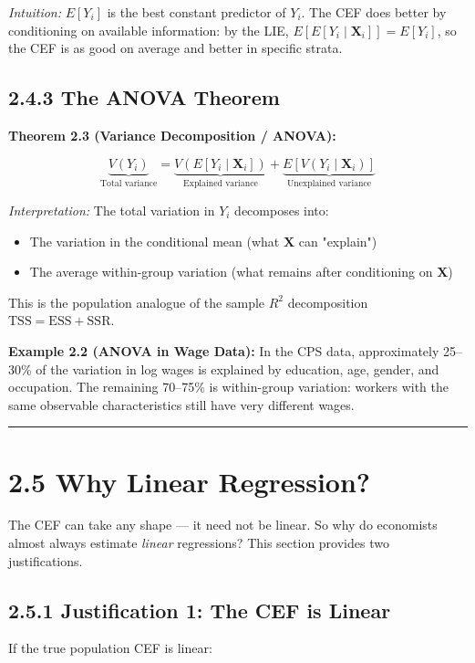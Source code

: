 \textit{Intuition:} $E[Y_i]$ is the best constant predictor of $Y_i$. The CEF does better by conditioning on available information: by the LIE, $E[E[Y_i \mid \mathbf{X}_i]] = E[Y_i]$, so the CEF is as good on average and better in specific strata.

\subsection{2.4.3 The ANOVA Theorem}

\textbf{Theorem 2.3 (Variance Decomposition / ANOVA):}

\[
\underbrace{V(Y_i)}_{\text{Total variance}} = \underbrace{V(E[Y_i \mid \mathbf{X}_i])}_{\text{Explained variance}} + \underbrace{E[V(Y_i \mid \mathbf{X}_i)]}_{\text{Unexplained variance}}
\]

\textit{Interpretation:} The total variation in $Y_i$ decomposes into:
\begin{itemize}
\item The variation in the conditional mean (what $\mathbf{X}$ can "explain")
\item The average within-group variation (what remains after conditioning on $\mathbf{X}$)
\end{itemize}

This is the population analogue of the sample $R^2$ decomposition $\text{TSS} = \text{ESS} + \text{SSR}$.

\textbf{Example 2.2 (ANOVA in Wage Data):} In the CPS data, approximately 25--30\% of the variation in log wages is explained by education, age, gender, and occupation. The remaining 70--75\% is within-group variation: workers with the same observable characteristics still have very different wages.

\medskip\hrule\medskip

\section{2.5 Why Linear Regression?}

The CEF can take any shape --- it need not be linear. So why do economists almost always estimate \textit{linear} regressions? This section provides two justifications.

\subsection{2.5.1 Justification 1: The CEF is Linear}

If the true population CEF is linear:

